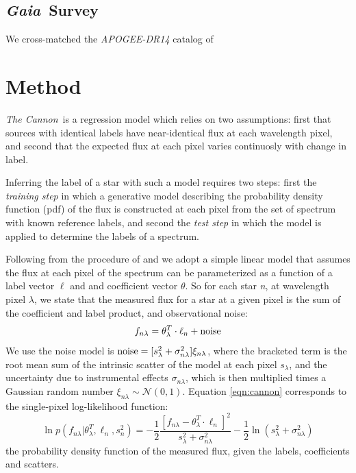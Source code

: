 \documentclass[twocolumn]{aastex62}
\newcommand{\thecannon}{\textsl{The Cannon}}
\newcommand{\gaia}{\textsl{Gaia}}
\begin{document}
\subsection{\gaia\ Survey}

We cross-matched the {\sl APOGEE-DR14} catalog of  \citep{Brown:2018} \\

\section{Method} \label{sec:methods}

\thecannon\ is a regression model which relies on two assumptions: first that sources with identical labels have near-identical flux at each wavelength pixel, and second that the expected flux at each pixel varies continuosly with change in label. 

Inferring the label of a star with such a model requires two steps: first the \emph{training step} in which a generative model describing the probability density function (pdf) of the flux is constructed at each pixel from the set of spectrum with known reference labels, and second the \emph{test step} in which the model is applied to determine the labels of a spectrum.

Following from the procedure of \citealt{Ness:2015} and \citealt{Ho:2017a} we adopt a simple linear model that assumes the flux at each pixel of the spectrum can be parameterized as a function of a label vector $\ell$ and and coefficient vector \emph{$\theta$}. So for each star \emph{n}, at wavelength pixel \emph{$\lambda$}, we state that the measured flux for a star at a given pixel is the sum of the coefficient and label product, and observational noise:
\begin{equation}
	f_{n\lambda} = \theta_{\lambda}^{T} \cdot \ell_{n} + {\rm noise} \label{eqn:cannon}
\end{equation} 
We use the noise model is ${\rm noise}=[s_{\lambda}^2 + \sigma_{n\lambda}^2]\xi_{n\lambda}$, where the bracketed term is the root mean sum of the intrinsic scatter of the model at each pixel \emph{$s_{\lambda}$}, and the uncertainty due to instrumental effects \emph{$\sigma_{n\lambda}$}, which is then multiplied times a Gaussian random number $\xi_{n\lambda} \sim \mathcal{N} (0,1)$. Equation \ref{eqn:cannon} corresponds to the single-pixel log-likelihood function:
\begin{equation}
	\ln p(f_{n\lambda}|\theta^T_{\lambda}, \ell_n, s^2_n) = 
	-\frac{1}{2}\frac{[f_{n\lambda} - \theta_{\lambda}^{T} \cdot \ell_{n}]^2}{s_{\lambda}^2 + \sigma_{n\lambda}^2} - \frac{1}{2} \ln(s_{\lambda}^2 + \sigma_{n\lambda}^2) 
	\label{eqn:likelihood}
\end{equation}
the probability density function of the measured flux, given the labels, coefficients and scatters.
\end{document}
